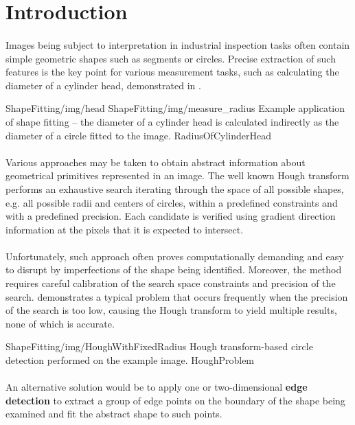 \section{Introduction}

\paragraph*{}
Images being subject to interpretation in industrial inspection tasks often contain simple geometric shapes such as segments or circles. Precise extraction of such features is the key point for various measurement tasks, such as calculating the diameter of a cylinder head, demonstrated in .

\twoFigures
{ShapeFitting/img/head}
{ShapeFitting/img/measure_radius}
{Example application of shape fitting -- the diameter of a cylinder head is calculated indirectly as the diameter of a circle fitted to the image.}
{RadiusOfCylinderHead}
{\basicWidth}


\paragraph*{}
Various approaches may be taken to obtain abstract information about geometrical primitives represented in an image. The well known Hough transform performs an exhaustive search iterating through the space of all possible shapes, e.g. all possible radii and centers of circles, within a predefined constraints and with a predefined precision. Each candidate is verified using gradient direction information at the pixels that it is expected to intersect.

\paragraph*{}
Unfortunately, such approach often proves computationally demanding and easy to disrupt by imperfections of the shape being identified. Moreover, the method requires careful calibration of the search space constraints and precision of the search.  demonstrates a typical problem that occurs frequently when the precision of the search is too low, causing the Hough transform to yield multiple results, none of which is accurate.

\oneFigure
{ShapeFitting/img/HoughWithFixedRadius}
{Hough transform-based circle detection performed on the example image.}
{HoughProblem}
{\basicWidth}

\paragraph*{}
An alternative solution would be to apply one or two-dimensional \textbf{edge detection} to extract a group of edge points on the boundary of the shape being examined and fit the abstract shape to such points.

